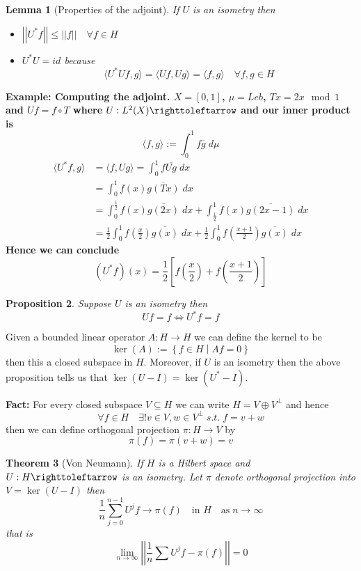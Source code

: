 \documentclass[11pt]{article}
\newcommand{\defeq}{:=}
\newcommand{\norm}[1]{\left|\left|#1\right|\right|}
\newcommand{\relmiddle}[1]{\mathrel{}\middle#1\mathrel{}}
\newcommand{\rmv}{\relmiddle|}
\newcommand{\toitself}{\righttoleftarrow}
\newcommand{\mdf}[1]{{\color{red} #1}}
\newenvironment{eg}
	{\begin{mdframed}[backgroundcolor=mylg,roundcorner=5pt,linewidth=0pt]\bfseries{Example:}\normalfont}
	{\end{mdframed}}
\newtheorem{prop}{Proposition}[section]
\newtheorem{theorem}[prop]{Theorem}
\newtheorem{lemma}[prop]{Lemma}
\begin{document}
\begin{lemma}[Properties of the adjoint]
If $U$ is an isometry then 
\begin{itemize}
	\item $\norm{U^\ast f} \leq \norm{f} \quad \forall f\in H$
	\item $U^\ast U = id $ because
		\[
		\langle U^\ast U f, g \rangle = \langle Uf, Ug\rangle = \langle f, g\rangle \quad \forall f,g \in H
		\]
\end{itemize}
\end{lemma}
\begin{eg}
	\textbf{Computing the adjoint.}
	$X=[0,1]$, $\mu=Leb$, $Tx=2x \mod 1$ and $Uf = f\circ T$ where $U:L^2(X)\toitself$ and our inner product is
	\[
		\langle f, g\rangle \defeq \int_0^1 f \overline{g} \; d\mu
	\]
	\begin{align*}
		\langle U^\ast f, g\rangle & = \langle f, Ug\rangle = \int_0^1 f \overline{Ug} \; dx \\
								   & = \int_0^1 f(x)\overline{g(Tx)}\; dx \\
								   & = \int_0^{\frac{1}{2}} f(x)\overline{g(2x)} \; dx + \int_{\frac{1}{2}}^1 f(x)\overline{g(2x-1)}\; dx \\
								   & = \frac{1}{2}\int_0^1 f\left( \frac{x}{2}\right)\overline{g(x)}\; dx + 
										\frac{1}{2}\int_0^1 f\left( \frac{x+1}{2}\right)\overline{g(x)}\; dx
	\end{align*}
	Hence we can conclude 
	\[
		(U^\ast f)(x) = \frac{1}{2}\left[ f \left( \frac{x}{2}\right) + f \left( \frac{x+1}{2}\right)\right]
	\]
\end{eg}

\begin{prop}
Suppose $U$ is an isometry then
\[
Uf=f \iff U^\ast f = f
\]
\end{prop}

Given a bounded linear operator $A:H\to H$ we can define the \mdf{kernel} to be
\[
	\ker(A) \defeq \left\{ f\in H \rmv Af = 0\right\}
\]
then this a closed subspace in $H$.
Moreover, if $U$ is an isometry then the above proposition tells us that $\ker(U-I)=\ker(U^\ast - I)$.

\textbf{Fact: }
For every closed subspace $V\subseteq H$ we can write $H=V \oplus V^\perp$ and hence
\[
\forall f\in H \quad \exists ! v\in V, w\in V^\perp \; s.t. \; f= v+ w
\]
then we can define \mdf{orthogonal projection} $\pi: H \to V$ by
\[
	\pi(f) = \pi (v+ w) = v
\]

\begin{theorem}[Von Neumann]
If $H$ is a Hilbert space and $U:H\toitself$ is an isometry.
Let $\pi$ denote orthogonal projection into $V=\ker(U-I)$ then
\[
	\frac{1}{n}\sum_{j=0}^{n-1}U^j f \to \pi (f) \quad \text{in }H \quad \text{as} \; n\to \infty
\]
that is
\[
\lim_{n\to\infty}\norm{\frac{1}{n}\sum U^j f - \pi(f)} = 0
\]
\end{theorem}
\end{document}
